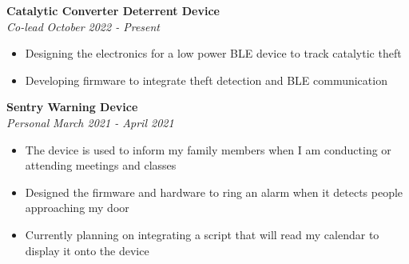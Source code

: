 \documentclass[a4paper,20pt]{article}
\begin{document}
    \vspace{-1pt}
        \textbf{Catalytic Converter Deterrent Device} \\
        \textit{Co-lead} \hspace{13.25cm}
        \textit{October 2022 - Present}
        \vspace{-6pt}
    \begin{itemize}
        \item Designing the electronics for a low power BLE device to track catalytic theft \vspace{-5pt}
        \item Developing firmware to integrate theft detection and BLE communication 
    \end{itemize}
    \vspace{-1pt}
        \textbf{Sentry Warning Device} \\
        \textit{Personal} \hspace{12.8cm}
        \textit{March 2021 - April 2021}
        \vspace{-6pt}
    \begin{itemize}
        \item The device is used to inform my family members when I am conducting or attending meetings and classes \vspace{-5pt}
        \item Designed the firmware and hardware to ring an alarm when it detects people approaching my door \vspace{-5pt}
        \item Currently planning on integrating a script that will read my calendar to display it onto the device
    \end{itemize}
\end{document}
